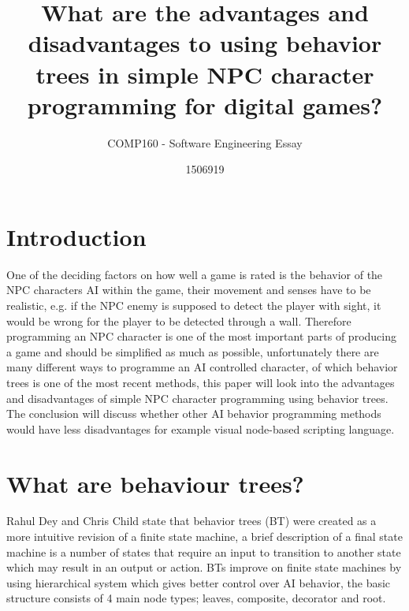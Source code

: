 \documentclass{scrartcl}
\title{What are the advantages and disadvantages to using behavior trees in simple NPC character programming for digital games?}
\subtitle{COMP160 - Software Engineering Essay}
\author{1506919}
\begin{document}
\maketitle


\section{Introduction}

One of the deciding factors on how well a game is rated is the behavior of the NPC characters AI within the game, their movement and senses have to be realistic\cite{dey2013ql}, e.g. if the NPC enemy is supposed to detect the player with sight, it would be wrong for the player to be detected through a wall. Therefore programming an NPC character is one of the most important parts of producing a game\cite{buckland2005programming} and should be simplified as much as possible, unfortunately there are many different ways to programme an AI controlled character, of which behavior trees is one of the most recent methods\cite{GDCVault}, this paper will look into the advantages and disadvantages of simple NPC character programming using behavior trees. The conclusion will discuss whether other AI behavior programming methods would have less disadvantages for example visual node-based scripting language.

\section{What are behaviour trees?}

Rahul Dey and Chris Child state that behavior trees (BT) were created as a more intuitive revision of a finite state machine\cite{dey2013ql}, a brief description of a final state machine is a number of states that require an input to transition to another state which may result in an output or action\cite{buckland2005programming}. BTs improve on finite state machines by using hierarchical system which gives better control over AI behavior, the basic structure consists of 4 main node types\cite{gamasutra}; leaves, composite, decorator and root.
\end{document}
